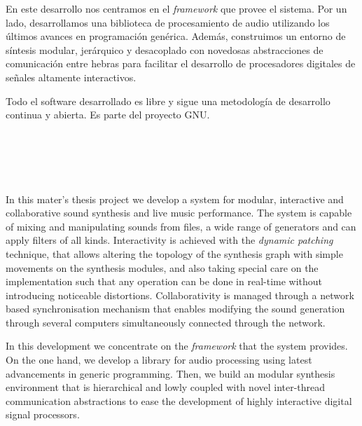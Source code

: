 En este desarrollo nos centramos en el \emph{framework} que provee el
sistema. Por un lado, desarrollamos una biblioteca  de
procesamiento de audio utilizando los últimos avances en programación
genérica. Además, construimos un entorno de síntesis modular,
jerárquico y desacoplado con novedosas abstracciones de comunicación
entre hebras para facilitar el desarrollo de procesadores digitales de
señales altamente interactivos.

Todo el software desarrollado es libre y sigue una metodología de
desarrollo continua y abierta. Es parte del proyecto GNU.


\clearpage
\thispagestyle{empty}
\begin{center}
{\large\bfseries \myTitle}\\
\end{center}
\begin{center}
\myName
\end{center}
\\
\vspace{0.7cm}

\\
In this mater's thesis project we develop a system for modular,
interactive and collaborative sound synthesis and live music
performance. The system is capable of mixing and manipulating sounds
from files, a wide range of generators and can apply filters of all
kinds. Interactivity is achieved with the \emph{dynamic patching}
technique, that allows altering the topology of the synthesis graph
with simple movements on the synthesis modules, and also taking
special care on the implementation such that any operation can be done
in real-time without introducing noticeable
distortions. Collaborativity is managed through a network based
synchronisation mechanism that enables modifying the sound generation
through several computers simultaneously connected through the
network.

In this development we concentrate on the \emph{framework} that the
system provides. On the one hand, we develop a library for audio
processing using latest advancements in generic programming. Then, we
build an modular synthesis environment that is hierarchical and lowly
coupled with novel inter-thread communication abstractions to ease the
development of highly interactive digital signal processors. 

